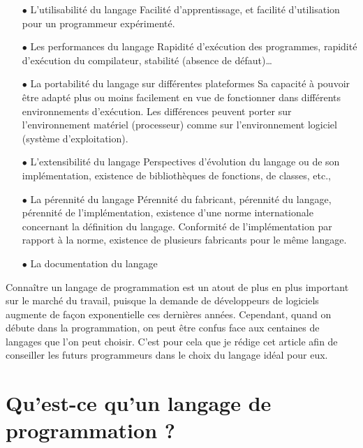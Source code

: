 \documentclass[a4paper,12pt]{article} %
\begin{document}
\begin{itemize}
\item[$\bullet$]L’utilisabilité du langage
Facilité d'apprentissage, et facilité d'utilisation pour un programmeur expérimenté.
\item[$\bullet$]Les performances du langage
Rapidité d'exécution des programmes, rapidité d'exécution du compilateur,  stabilité (absence de défaut)…
\item[$\bullet$]La portabilité du langage sur différentes plateformes
Sa capacité à pouvoir être adapté plus ou moins facilement en vue de fonctionner dans différents environnements d'exécution. Les différences peuvent porter sur l'environnement matériel (processeur) comme sur l'environnement logiciel (système d'exploitation).
\item[$\bullet$]L’extensibilité du langage
Perspectives d'évolution du langage ou de son implémentation, existence de bibliothèques de fonctions, de classes, etc.,
\item[$\bullet$]La pérennité du langage
Pérennité du fabricant, pérennité du langage, pérennité de l'implémentation, existence d'une norme internationale concernant la définition du langage. Conformité de l'implémentation par rapport à la norme, existence de plusieurs fabricants pour le même langage.
\item[$\bullet$]La documentation du langage
\end{itemize}
Connaître un langage de programmation est un atout de plus en plus important sur le marché du travail, puisque la demande de développeurs de logiciels augmente de façon exponentielle ces dernières années.
Cependant, quand on débute dans la programmation, on peut être confus face aux centaines de langages que l’on peut choisir. C’est pour cela que je rédige cet article afin de conseiller les futurs programmeurs dans le choix du langage idéal pour eux.

\section{Qu’est-ce qu’un langage de programmation ?} %
\end{document}
